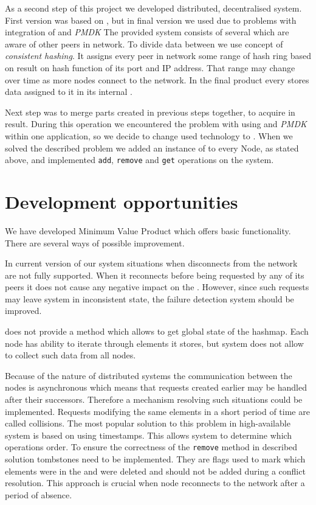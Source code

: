 As a second step of this project we developed distributed, decentralised system.
First version was based on \Seastar, but in final version we used \Asio due to problems with integration of \Seastar and \textit{PMDK}
The provided system consists of several \Nodes which are aware of other peers in network. 
To divide data between \Nodes we use concept of \textit{consistent hashing}.
It assigns every peer in network some range of hash ring based on result on hash function of its port and IP address. 
That range may change over time as more nodes connect to the network.
In the final product every \Node stores data assigned to it in its internal \PHT. 

Next step was to merge parts created in previous steps together, to acquire \DHTS in result. 
During this operation we encountered the problem with using \Seastar and \textit{PMDK} within one application, so we decide to change used technology to \Asio. 
When we solved the described problem we added an instance of \PHT to every Node, as stated above, and implemented \texttt{add}, \texttt{remove} and \texttt{get} operations on the system.

\section{Development opportunities}

We have developed Minimum Value Product which offers basic functionality. 
There are several ways of possible improvement.

In current version of our system situations when \Node disconnects from the network are not fully supported.
When it reconnects before being requested by any of its peers it does not cause any negative impact on the \DHTS. 
However, since such requests may leave system in inconsistent state, the failure detection system should be improved.

\DHTS does not provide a method which allows to get global state of the hashmap. 
Each node has ability to iterate through elements it stores, but system does not allow to collect such data from all nodes.

Because of the nature of distributed systems the communication between the nodes is asynchronous which means that requests created earlier may be handled after their successors.
Therefore a mechanism resolving such situations could be implemented.
Requests modifying the same elements in a short period of time are called collisions.
The most popular solution to this problem in high-available system is based on using timestamps.
This allows system to determine which operations order.
To ensure the correctness of the \texttt{remove} method in described solution tombstones need to be implemented.
They are flags used to mark which elements were in the \PHT and were deleted and should not be added during a conflict resolution.
This approach is crucial when node reconnects to the network after a period of absence.

